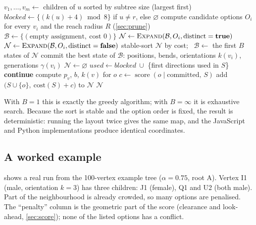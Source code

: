 \documentclass[11pt,a4paper]{article}
\newcommand{\Score}{\operatorname{score}}
\begin{document}
\begin{algorithm}[ht]
\caption{\textsc{PlaceChildren}$(u)$: beam search for the children of $u$ (beam width $B=4$)}
\label{alg:beam}
\begin{algorithmic}[1]
\State $v_1,\dots,v_m \gets$ children of $u$ sorted by subtree size (largest first)
\State $\mathit{blocked} \gets \{(k(u)+4)\bmod 8\}$ if $u\neq r$, else $\varnothing$
\State compute candidate options $O_i$ for every $v_i$ and the reach radius $R$ (\cref{sec:prune})
\State $\mathcal B \gets \{(\text{empty assignment},\ \text{cost } 0)\}$
  \State $\mathcal N \gets \textsc{Expand}(\mathcal B, O_i, \text{distinct}=\textbf{true})$
   
     \State $\mathcal N \gets \textsc{Expand}(\mathcal B, O_i, \text{distinct}=\textbf{false})$
  \EndIf
  \State stable-sort $\mathcal N$ by cost; \ $\mathcal B \gets$ the first $B$ states of $\mathcal N$
\EndFor
\State commit the best state of $\mathcal B$: positions, bends, orientations $k(v_i)$, generations $\gamma(v_i)$
\Statex
{}
  \State $\mathcal N\gets\varnothing$
    \State $\mathit{used}\gets \mathit{blocked}\ \cup$ \{first directions used in $S$\}
       \textbf{continue} \EndIf
      \State compute $p_v$, $b$, $k(v)$ for $o$ 
      \State $c \gets \Score(o\mid \text{committed},\,S)$ 
      \State add $\bigl(S\cup\{o\},\ \mathrm{cost}(S)+c\bigr)$ to $\mathcal N$
    \EndFor
  \EndFor
  \State \Return $\mathcal N$
\EndFunction
\end{algorithmic}
\end{algorithm}

With $B=1$ this is exactly the greedy algorithm; with $B=\infty$ it is exhaustive search. Because the sort is stable and the option order is fixed, the result is deterministic: running the layout twice gives the same map, and the JavaScript and Python implementations produce identical coordinates.

\subsection{A worked example}

 shows a real run from the 100-vertex example tree ($\alpha=0.75$, root A). Vertex I1 (male, orientation $k=3$) has three children: J1 (female), Q1 and U2 (both male). Part of the neighbourhood is already crowded, so many options are penalised. The ``penalty'' column is the geometric part of the score (clearance and look-ahead, \cref{sec:score}); none of the listed options has a conflict.
\end{document}
